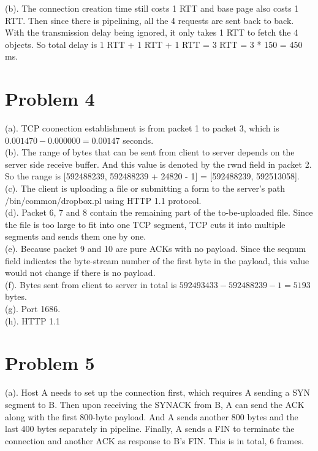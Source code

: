 \documentclass[titlepage, paper=a4, fontsize=11pt]{scrartcl} %
\numberwithin{equation}{section} %
\numberwithin{table}{section} %
\begin{document}
(b).
The connection creation time still costs 1 RTT and base page also costs 1 RTT. Then since there is pipelining, all the 4 requests are sent back to back. With the transmission delay being ignored, it only takes 1 RTT to fetch the 4 objects. So total delay is 1 RTT + 1 RTT + 1 RTT = 3 RTT = 3 * 150 = 450 ms.
\\




\section*{Problem 4}
(a).
TCP coonection establishment is from packet 1 to packet 3, which is $0.001470-0.000000=0.00147$ seconds. \\
(b).
The range of bytes that can be sent from client to server depends on the server side receive buffer.
And this value is denoted by the rwnd field in packet 2. So the range is [592488239, 592488239 + 24820 - 1] = [592488239, 592513058]. \\
(c).
The client is uploading a file or submitting a form to the server's path /bin/common/dropbox.pl using HTTP 1.1 protocol. \\
(d).
Packet 6, 7 and 8 contain the remaining part of the to-be-uploaded file. Since the file is too large to fit into one TCP segment, TCP cuts it into multiple segments and sends them one by one. \\
(e).
Because packet 9 and 10 are pure ACKs with no payload. Since the seqnum field indicates the byte-stream number of the first byte in the payload, this value would not change if there is no payload. \\
(f).
Bytes sent from client to server in total is $592493433-592488239-1=5193$ bytes. \\
(g).
Port 1686. \\
(h).
HTTP 1.1
\\



\section*{Problem 5}
(a).
Host A needs to set up the connection first, which requires A sending a SYN segment to B. Then upon receiving the SYNACK from B, A can send the ACK along with the first 800-byte payload. And A sends another 800 bytes and the last 400 bytes separately in pipeline. Finally, A sends a FIN to terminate the connection and another ACK as response to B's FIN. This is in total, 6 frames. \\
\end{document}
